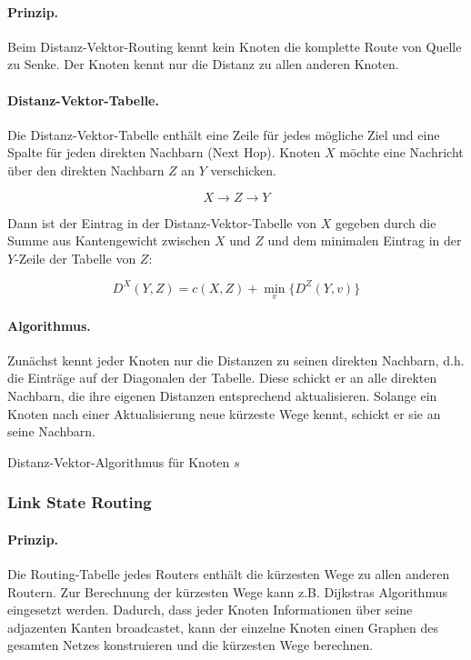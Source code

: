 \documentclass[]{scrartcl}
\begin{document}
\paragraph{Prinzip.}Beim Distanz-Vektor-Routing kennt kein Knoten die komplette Route von Quelle zu Senke. Der Knoten kennt nur die Distanz zu allen anderen Knoten.

\paragraph{Distanz-Vektor-Tabelle.} Die Distanz-Vektor-Tabelle enth\"alt eine Zeile f\"ur jedes m\"ogliche Ziel und eine Spalte f\"ur jeden direkten Nachbarn (Next Hop). Knoten $X$ m\"ochte eine Nachricht \"uber den direkten Nachbarn $Z$ an $Y$ verschicken.

$$X \to Z \to Y$$

Dann ist der Eintrag in der Distanz-Vektor-Tabelle von $X$ gegeben durch die Summe aus Kantengewicht zwischen $X$ und $Z$ und dem minimalen Eintrag in der $Y$-Zeile der Tabelle von $Z$:

$$D^X (Y,Z) = c(X,Z) + \min_{v}\{ D^Z (Y,v)\}$$

\paragraph{Algorithmus.} Zun\"achst kennt jeder Knoten nur die Distanzen zu seinen direkten Nachbarn, d.h. die Eintr\"age auf der Diagonalen der Tabelle. Diese schickt er an alle direkten Nachbarn, die ihre eigenen Distanzen entsprechend aktualisieren. Solange ein Knoten nach einer Aktualisierung neue k\"urzeste Wege kennt, schickt er sie an seine Nachbarn.

\begin{algorithm}[htbp]
\caption{Distanz-Vektor-Algorithmus f\"ur Knoten $s$}

\end{algorithm}


\subsubsection{Link State Routing} 

\paragraph{Prinzip.} Die Routing-Tabelle jedes Routers enth\"alt die k\"urzesten Wege zu allen anderen Routern. Zur Berechnung der k\"urzesten Wege kann z.B. Dijkstras Algorithmus eingesetzt werden. Dadurch, dass jeder Knoten Informationen \"uber seine adjazenten Kanten broadcastet, kann der einzelne Knoten einen Graphen des gesamten Netzes konstruieren und die k\"urzesten Wege berechnen.
\end{document}
